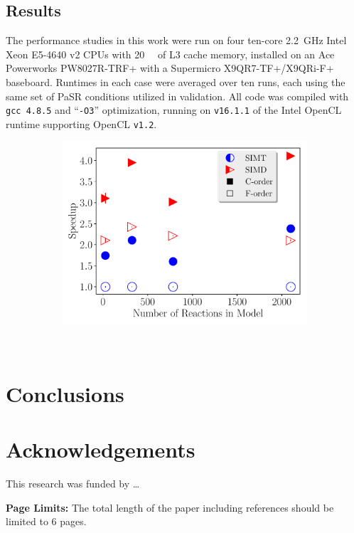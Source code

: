 \documentclass[12pt]{ussci}
\begin{document}
\subsection{Results}
\label{S:results}
The performance studies in this work were run on four ten-core \SI{2.2}{\giga\hertz} Intel Xeon E5-4640 v2 CPUs with \SI{20}{\mega\byte} of L3 cache memory, installed on an Ace Powerworks PW8027R-TRF+ with a Supermicro X9QR7-TF+/X9QRi-F+ baseboard.
Runtimes in each case were averaged over ten runs, each using the same set of PaSR conditions utilized in validation.
All code was compiled with \texttt{gcc 4.8.5} and ``\texttt{-O3}'' optimization, running on \texttt{v16.1.1} of the Intel OpenCL runtime supporting OpenCL \texttt{v1.2}.

\begin{figure}[htb]
  \centering
  \begin{subfigure}[t]{0.5\textwidth}
    \includegraphics[width=\textwidth]{SIMD_SIMT_Order_comparison.pdf}
    \caption{}
    \label{F:SIMDComp}
  \end{subfigure}
  ~
  
\end{figure}



\label{results}

\section{Conclusions}
%

\section{Acknowledgements}
This research was funded by \ldots

\noindent\textbf{Page Limits:} The total length of the paper including references should be limited to 6 pages.

\printbibliography[heading=bibintoc]
\end{document}
